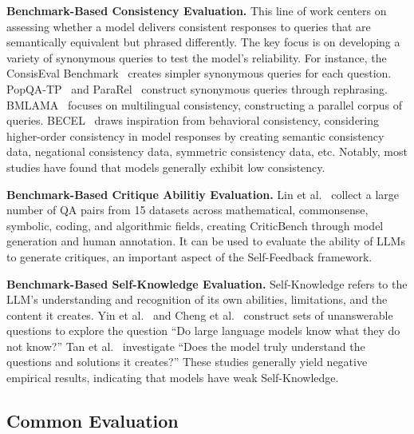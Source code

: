 \documentclass[lettersize,journal]{IEEEtran}
\begin{document}
\textbf{Benchmark-Based Consistency Evaluation.} This line of work centers on assessing whether a model delivers consistent responses to queries that are semantically equivalent but phrased differently. The key focus is on developing a variety of synonymous queries to test the model's reliability. For instance, the ConsisEval Benchmark~\cite{ConsisEval_24_arXiv_PKU} creates simpler synonymous queries for each question. PopQA-TP~\cite{PopQA_23_GEM_IBM} and ParaRel~\cite{ParaRel_21_TACL_BarIlan} construct synonymous queries through rephrasing. BMLAMA~\cite{CrossLingualConsistency_23_EMNLP_UoGroningen} focuses on multilingual consistency, constructing a parallel corpus of queries. BECEL~\cite{BECEL_22_Coling_Oxford} draws inspiration from behavioral consistency, considering higher-order consistency in model responses by creating semantic consistency data, negational consistency data, symmetric consistency data, etc. Notably, most studies have found that models generally exhibit low consistency.

\textbf{Benchmark-Based Critique Abilitiy Evaluation.} Lin et al.~\cite{CriticBench_24_arXiv_THU} collect a large number of QA pairs from 15 datasets across mathematical, commonsense, symbolic, coding, and algorithmic fields, creating CriticBench through model generation and human annotation. It can be used to evaluate the ability of LLMs to generate critiques, an important aspect of the Self-Feedback framework.

\textbf{Benchmark-Based Self-Knowledge Evaluation.} Self-Knowledge refers to the LLM's understanding and recognition of its own abilities, limitations, and the content it creates. Yin et al.~\cite{TheoryKnowUnknown_23_ACL_Fudan} and Cheng et al.~\cite{TheoryKnowUnknown_24_arxiv_Fudan} construct sets of unanswerable questions to explore the question ``Do large language models know what they do not know?'' Tan et al.~\cite{EvalSelf_24_arXiv_THU} investigate ``Does the model truly understand the questions and solutions it creates?'' These studies generally yield negative empirical results, indicating that models have weak Self-Knowledge.


\subsection{Common Evaluation}
\end{document}
